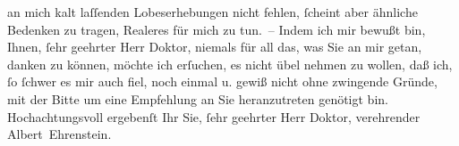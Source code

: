 \begin{ledgroupsized}[t]{13cm}
                    an mich kalt laſſenden Lobeserhebungen nicht fehlen, ſcheint aber ähnliche
                    Bedenken zu tragen, Realeres für mich zu tun. – Indem ich mir bewußt bin, Ihnen,
                    ſehr geehrter Herr Doktor, niemals für all das, was Sie an mir getan, danken zu
                    können, möchte ich erſuchen, es nicht übel nehmen zu wollen, daß ich, ſo ſchwer
                    es mir auch fiel, noch einmal u. gewiß nicht ohne zwingende Gründe, mit der
                    Bitte um eine Empfehlung an Sie heranzutreten genötigt bin. Hochachtungsvoll
                    ergebenſt Ihr Sie, ſehr geehrter Herr Doktor, verehrender\pend
           \pstart \spacefill\mbox{Albert Ehrenstein.}\pend{}
         
         \endnumbering{}\end{ledgroupsized}  \newcommand{\dateiname}{L01826}\newcommand{\titel}{Albert Ehrenstein an Arthur Schnitzler, 24. 1. 1909}\newcommand{\editorInnen}{Martin Anton Müller und Gerd-Hermann Susen}
      